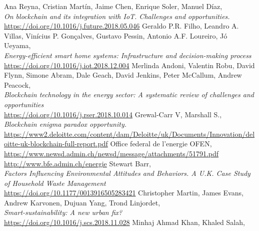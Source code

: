 \documentclass[11pt]{article}
\begin{document}
\begin{thebibliography}{22}
	Ana Reyna, Cristian Martín, Jaime Chen, Enrique Soler, Manuel Díaz, \\
	\textit{On blockchain and its integration with IoT. Challenges and opportunities.}\\
	\hyperref[https://doi.org/10.1016/j.future.2018.05.046]{https://doi.org/10.1016/j.future.2018.05.046}
	Geraldo P.R. Filho, Leandro A. Villas, Vinícius P. Gonçalves, Gustavo Pessin, Antonio A.F. Loureiro, Jó Ueyama, \\
	\textit{Energy-efficient smart home systems: Infrastructure
		and decision-making process}\\
	\hyperref[https://doi.org/10.1016/j.iot.2018.12.004]{https://doi.org/10.1016/j.iot.2018.12.004}
	Merlinda Andoni, Valentin Robu, David Flynn, Simone Abram, Dale Geach,  David Jenkins, Peter McCallum, Andrew Peacock,\\
	\textit{Blockchain technology in the energy sector: A systematic review of challenges and opportunities}\\
	\hyperref[https://doi.org/10.1016/j.rser.2018.10.014]{https://doi.org/10.1016/j.rser.2018.10.014}
	Grewal-Carr V, Marshall S., \\
	\textit{Blockchain enigma paradox opportunity.}\\
	\hyperref[https://www2.deloitte.com/content/dam/Deloitte/uk/Documents/Innovation/deloitte-uk-blockchain-full-report.pdf]{https://www2.deloitte.com/content/dam/Deloitte/uk/Documents/Innovation/deloitte-uk-blockchain-full-report.pdf}
	Office federal de l'energie OFEN, \\
	\hyperref[https://www.newsd.admin.ch/newsd/message/attachments/51791.pdf]{https://www.newsd.admin.ch/newsd/message/attachments/51791.pdf}\\
	\hyperref[http://www.bfe.admin.ch/energie]{http://www.bfe.admin.ch/energie}
	Stewart Barr, \\
	\textit{Factors Influencing Environmental Attitudes and Behaviors. A U.K. Case Study of Household Waste Management}\\
	\hyperref[https://doi.org/10.1177/0013916505283421]{https://doi.org/10.1177/0013916505283421}
	Christopher Martin, James Evans, Andrew Karvonen, Dujuan Yang, Trond Linjordet, \\
	\textit{Smart-sustainability: A new urban fix?}\\
	\hyperref[https://doi.org/10.1016/j.scs.2018.11.028]{https://doi.org/10.1016/j.scs.2018.11.028}
	Minhaj Ahmad Khan, Khaled Salah, \\

\end{thebibliography}
\end{document}
